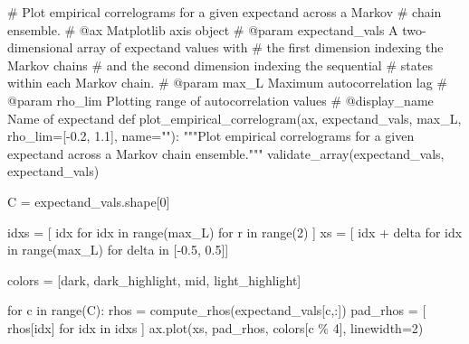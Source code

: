 \documentclass[
  letterpaper,
  DIV=11,
  numbers=noendperiod]{scrartcl}
\newenvironment{Shaded}{\begin{snugshade}}{\end{snugshade}}
\newcommand{\BuiltInTok}[1]{\textcolor[rgb]{0.00,0.23,0.31}{#1}}
\newcommand{\CommentTok}[1]{\textcolor[rgb]{0.37,0.37,0.37}{#1}}
\newcommand{\ControlFlowTok}[1]{\textcolor[rgb]{0.00,0.23,0.31}{#1}}
\newcommand{\DecValTok}[1]{\textcolor[rgb]{0.68,0.00,0.00}{#1}}
\newcommand{\FloatTok}[1]{\textcolor[rgb]{0.68,0.00,0.00}{#1}}
\newcommand{\KeywordTok}[1]{\textcolor[rgb]{0.00,0.23,0.31}{#1}}
\newcommand{\NormalTok}[1]{\textcolor[rgb]{0.00,0.23,0.31}{#1}}
\newcommand{\OperatorTok}[1]{\textcolor[rgb]{0.37,0.37,0.37}{#1}}
\newcommand{\StringTok}[1]{\textcolor[rgb]{0.13,0.47,0.30}{#1}}
\begin{document}
\begin{Shaded}
\begin{Highlighting}[]
\CommentTok{\# Plot empirical correlograms for a given expectand across a Markov}
\CommentTok{\# chain ensemble.}
\CommentTok{\# @ax Matplotlib axis object}
\CommentTok{\# @param expectand\_vals A two{-}dimensional array of expectand values with}
\CommentTok{\#                       the first dimension indexing the Markov chains}
\CommentTok{\#                       and the second dimension indexing the sequential}
\CommentTok{\#                       states within each Markov chain.}
\CommentTok{\# @param max\_L Maximum autocorrelation lag}
\CommentTok{\# @param rho\_lim Plotting range of autocorrelation values}
\CommentTok{\# @display\_name Name of expectand}
\KeywordTok{def}\NormalTok{ plot\_empirical\_correlogram(ax,}
\NormalTok{                               expectand\_vals,}
\NormalTok{                               max\_L,}
\NormalTok{                               rho\_lim}\OperatorTok{=}\NormalTok{[}\OperatorTok{{-}}\FloatTok{0.2}\NormalTok{, }\FloatTok{1.1}\NormalTok{],}
\NormalTok{                               name}\OperatorTok{=}\StringTok{""}\NormalTok{):}
  \CommentTok{"""Plot empirical correlograms for a given expectand across a Markov}
\CommentTok{     chain ensemble."""}
\NormalTok{  validate\_array(expectand\_vals, }\StringTok{\textquotesingle{}expectand\_vals\textquotesingle{}}\NormalTok{)}

\NormalTok{  C }\OperatorTok{=}\NormalTok{ expectand\_vals.shape[}\DecValTok{0}\NormalTok{]}

\NormalTok{  idxs }\OperatorTok{=}\NormalTok{ [ idx }\ControlFlowTok{for}\NormalTok{ idx }\KeywordTok{in} \BuiltInTok{range}\NormalTok{(max\_L) }\ControlFlowTok{for}\NormalTok{ r }\KeywordTok{in} \BuiltInTok{range}\NormalTok{(}\DecValTok{2}\NormalTok{) ]}
\NormalTok{  xs }\OperatorTok{=}\NormalTok{ [ idx }\OperatorTok{+}\NormalTok{ delta }\ControlFlowTok{for}\NormalTok{ idx }\KeywordTok{in} \BuiltInTok{range}\NormalTok{(max\_L) }\ControlFlowTok{for}\NormalTok{ delta }\KeywordTok{in}\NormalTok{ [}\OperatorTok{{-}}\FloatTok{0.5}\NormalTok{, }\FloatTok{0.5}\NormalTok{]]}

\NormalTok{  colors }\OperatorTok{=}\NormalTok{ [dark, dark\_highlight, mid, light\_highlight]}

  \ControlFlowTok{for}\NormalTok{ c }\KeywordTok{in} \BuiltInTok{range}\NormalTok{(C):}
\NormalTok{    rhos }\OperatorTok{=}\NormalTok{ compute\_rhos(expectand\_vals[c,:])}
\NormalTok{    pad\_rhos }\OperatorTok{=}\NormalTok{ [ rhos[idx] }\ControlFlowTok{for}\NormalTok{ idx }\KeywordTok{in}\NormalTok{ idxs ]}
\NormalTok{    ax.plot(xs, pad\_rhos, colors[c }\OperatorTok{\%} \DecValTok{4}\NormalTok{], linewidth}\OperatorTok{=}\DecValTok{2}\NormalTok{)}


\end{Highlighting}
\end{Shaded}
\end{document}
